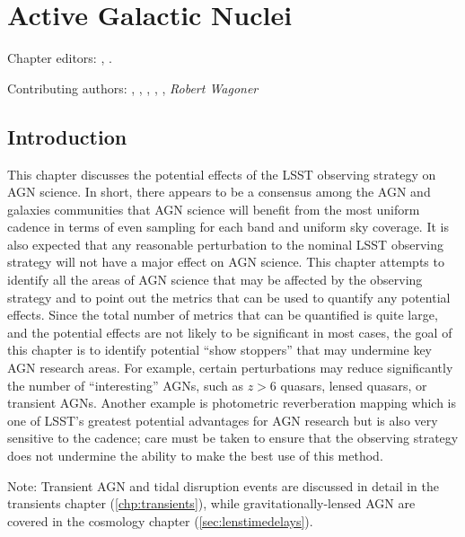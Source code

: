 
\chapter[AGN]{Active Galactic Nuclei}
\def\chpname{agn}\label{chp:\chpname}

Chapter editors:
,
.

Contributing authors:
,
,
,
,
,
{\it Robert Wagoner}


\section{Introduction}
\label{sec:\chpname:intro}


This chapter discusses the potential effects of the LSST observing
strategy on AGN science. In short, there appears to be a consensus
among the AGN and galaxies communities that AGN science will benefit
from the most uniform cadence in terms of even sampling for each band
and uniform sky coverage. It is also expected that any reasonable
perturbation to the nominal LSST observing strategy will not have a major
effect on AGN science. This chapter attempts to identify all
the areas of AGN science that may be affected by the observing strategy
and to point out the metrics that can be used to quantify any potential
effects. Since the total number of metrics that can be quantified is
quite large, and the potential effects are not likely to be significant in
most cases, the goal of this chapter is to identify potential ``show
stoppers'' that may undermine key AGN research areas. For example, certain
perturbations may reduce significantly the number of ``interesting'' AGNs,
such as $z>6$ quasars, lensed quasars, or transient AGNs. Another example
is photometric reverberation mapping which is one of LSST's greatest
potential advantages for AGN research but is also very sensitive to the
cadence; care must be taken to ensure that the observing strategy does
not undermine the ability to make the best use of this method.

Note: Transient AGN and tidal disruption events are discussed in
detail in the transients chapter
(\autoref{chp:transients}), while gravitationally-lensed AGN are
covered in the cosmology chapter (\autoref{sec:lenstimedelays}).


